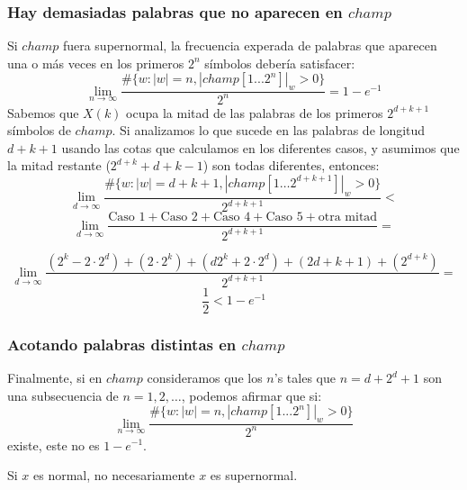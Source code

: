 \documentclass[10pt,mathserif]{beamer}%
\begin{document}
\begin{frame}
  \frametitle{Hay demasiadas palabras que no aparecen en $champ$}
  Si $champ$ fuera supernormal, la frecuencia experada de palabras que aparecen una o más veces en los primeros $2^n$ símbolos debería satisfacer:
$$\lim_{n\to\infty} \frac{\#\{w: |w| = n  , |champ[1...2^n]|_w > 0\}}{2^n}  = 1 - e^{-1}$$
\pause
Sabemos que $X(k)$ ocupa la mitad de las palabras de los primeros $2^{d+k+1}$ símbolos de $champ$.
Si analizamos lo que sucede en las palabras de longitud $d+k+1$ usando las cotas que calculamos en los diferentes casos, y asumimos que la mitad restante ($2^{d+k} + d + k - 1$) son todas diferentes, entonces:
  $$\lim_{d\to\infty} \frac{\#\{w : |w| = d+k+1, |champ[1 \dots 2^{d+k+1}]|_w > 0 \}}{2^{d+k+1}} <$$
  $$\lim_{d\to\infty} \frac{ \textrm{Caso 1} + \textrm{Caso 2}+ \textrm{Caso 4} + \textrm{Caso 5} + \textrm{otra mitad}}{2^{d+k+1}} =$$

  \pause 

    $$\lim_{d\to\infty} \frac{(2^k - 2\cdot 2^d) + (2 \cdot 2^k)+ (d2^k + 2 \cdot 2^d) + (2d+k+1) + (2^{d+k}) }{2^{d+k+1}} =$$
    $$\frac{1}{2} < 1 - e^{-1}$$

\end{frame}

\begin{frame}
  \frametitle{Acotando palabras distintas en $champ$}
  Finalmente, si en $champ$ consideramos que los $n$'s tales que $n = d + 2^d + 1$ son una subsecuencia de $n=1,2,\dots$, podemos afirmar que si:
  $$\lim_{n\to\infty} \frac{\#\{w: |w| = n  , |champ[1...2^n]|_w > 0\}}{2^n}$$
  existe, este no es $1 - e^{-1}$.

\begin{corollary}
Si $x$ es normal, no necesariamente $x$ es supernormal.
\end{corollary}
\end{frame}
\end{document}
